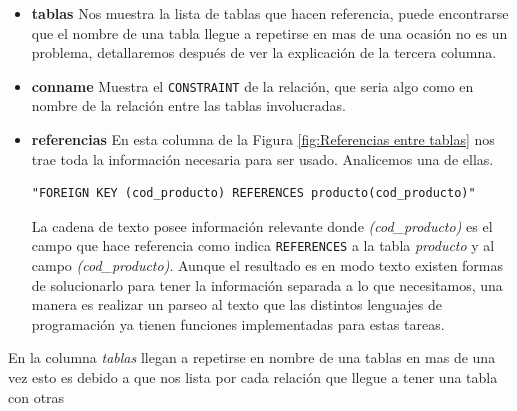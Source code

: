 \begin{itemize}
\item \textbf{tablas} Nos muestra la lista de tablas que hacen referencia, puede encontrarse que el nombre de una tabla llegue a repetirse en mas de una ocasi\'on no es un problema, detallaremos despu\'es de ver la explicaci\'on de la tercera columna.   
\item \textbf{conname} Muestra el \texttt{CONSTRAINT} de la relaci\'on, que seria algo como en nombre de la relaci\'on entre las tablas involucradas. 
\item \textbf{referencias} En esta columna de la Figura \ref{fig:Referencias entre tablas} nos trae toda la informaci\'on necesaria para ser usado. Analicemos una de ellas.
\lstset{language=sql,breaklines=true}
\begin{lstlisting}
"FOREIGN KEY (cod_producto) REFERENCES producto(cod_producto)"
\end{lstlisting}
La cadena de texto posee informaci\'on relevante donde \emph{(cod\_producto)} es el campo que hace referencia como indica \texttt{REFERENCES} a la tabla \emph{producto} y al campo  \emph{(cod\_producto)}.
Aunque el resultado es en modo texto existen formas de solucionarlo para tener la informaci\'on separada a lo que necesitamos, una manera es realizar un parseo al texto que las distintos lenguajes de programaci\'on ya tienen funciones implementadas para estas tareas. 
\end{itemize}
En la columna \emph{tablas} llegan a repetirse en nombre de una tablas en mas de una vez esto es debido a que nos lista por cada relaci\'on que llegue a tener una tabla con otras

